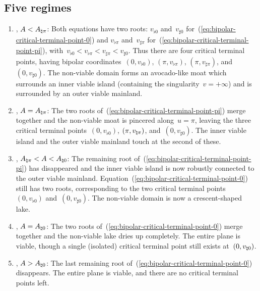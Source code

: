 \subsection{Five regimes}
\label{sec:bipolar.viable.regimes}

\begin{enumerate}
  \item
    , $A < A_{\natural \pi}$:
    Both equations have two roots:
    $v_{\flat 0}$ and~$v_{\sharp 0}$
    for~(\ref{eq:bipolar-critical-terminal-point-0})
    and
    $v_{\flat \pi}$ and~$v_{\sharp \pi}$
    for~(\ref{eq:bipolar-critical-terminal-point-pi}),
    with~$v_{\flat 0} < v_{\flat \pi} < v_{\sharp \pi} < v_{\sharp 0}$.
    Thus there are four critical terminal points,
    having bipolar coordinates~$(0, v_{\flat 0})$, $(\pi, v_{\flat \pi})$,
    $(\pi, v_{\sharp \pi})$, and~$(0, v_{\sharp 0})$.
    The non-viable domain forms an avocado-like moat
    which surrounds an inner viable island
    (containing the singularity~$v = +\infty$)
    and is surrounded by an outer viable mainland.
  \item
    , $A = A_{\natural \pi}$:
    The two roots of~(\ref{eq:bipolar-critical-terminal-point-pi})
    merge together
    and the non-viable moat is pincered along~$u = \pi$,
    leaving the three critical terminal points~$(0, v_{\flat 0})$,
    $(\pi, v_{\natural \pi})$, and~$(0, v_{\sharp 0})$.
    The inner viable island and the outer viable mainland
    touch at the second of these.
  \item
    , $A_{\natural \pi} < A < A_{\natural 0}$:
    The remaining root of~(\ref{eq:bipolar-critical-terminal-point-pi})
    has disappeared
    and the inner viable island is now robustly connected
    to the outer viable mainland.
    Equation~(\ref{eq:bipolar-critical-terminal-point-0}) still has two roots,
    corresponding to the two critical terminal points~%
      $(0, v_{\flat 0})$ and~$(0, v_{\sharp 0})$.
    The non-viable domain is now a crescent-shaped lake.
  \item
    , $A = A_{\natural 0}$:
    The two roots of~(\ref{eq:bipolar-critical-terminal-point-0})
    merge together
    and the non-viable lake dries up completely.
    The entire plane is viable,
    though a single (isolated) critical terminal point still exists
    at~$(0, v_{\natural 0})$.
  \item
    , $A > A_{\natural 0}$:
    The last remaining root of~(\ref{eq:bipolar-critical-terminal-point-0})
    disappears.
    The entire plane is viable,
    and there are no critical terminal points left.
\end{enumerate}
